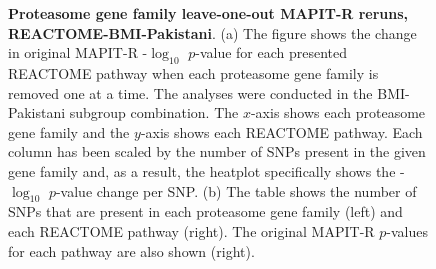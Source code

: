 \begin{figure}[ht]
\label{InterPath-Supp-Figure-Prot-Heatplots-Indian}
\end{figure}
\clearpage
\addtocounter{figure}{-1}
\addtocounter{CharNumber5}{1}

\begin{figure}[ht]
\centering
\vspace*{-.5cm}
\par
{}
\caption[TBD]{\textbf{Proteasome gene family leave-one-out MAPIT-R reruns, REACTOME-BMI-Pakistani}. (a) The figure shows the change in original MAPIT-R -$\log_{10}$ $p$-value for each presented REACTOME pathway when each proteasome gene family is removed one at a time. The analyses were conducted in the BMI-Pakistani subgroup combination. The $x$-axis shows each proteasome gene family and the $y$-axis shows each REACTOME pathway. Each column has been scaled by the number of SNPs present in the given gene family and, as a result, the heatplot specifically shows the -$\log_{10}$ $p$-value change per SNP. (b) The table shows the number of SNPs that are present in each proteasome gene family (left) and each REACTOME pathway (right). The original MAPIT-R $p$-values for each pathway are also shown (right).}

\end{figure}
